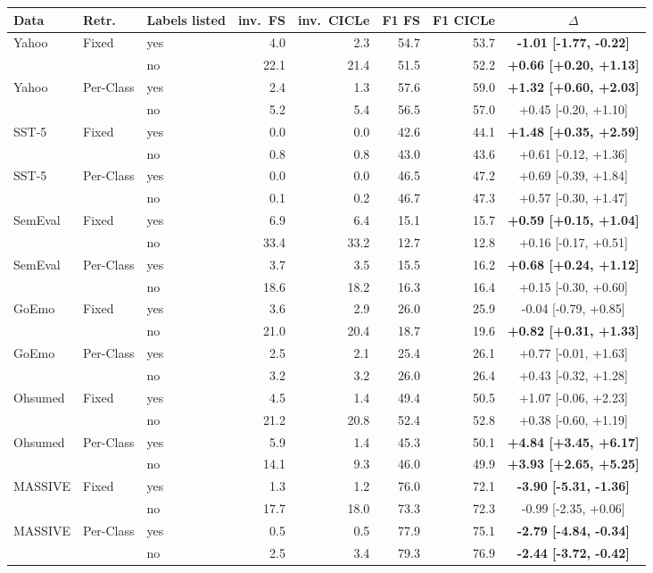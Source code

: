 \begin{tabular}{lllrrrrc}
\toprule
Data & Retr. & Labels listed & inv.\ FS & inv.\ CICLe & F1 FS & F1 CICLe & $\Delta$ \\
\midrule
Yahoo & Fixed & yes & 4.0 & 2.3 & 54.7 & 53.7 & \textbf{-1.01 [-1.77, -0.22]} \\
 &  & no & 22.1 & 21.4 & 51.5 & 52.2 & \textbf{+0.66 [+0.20, +1.13]} \\
Yahoo & Per-Class & yes & 2.4 & 1.3 & 57.6 & 59.0 & \textbf{+1.32 [+0.60, +2.03]} \\
 &  & no & 5.2 & 5.4 & 56.5 & 57.0 & +0.45 [-0.20, +1.10] \\
\addlinespace
SST-5 & Fixed & yes & 0.0 & 0.0 & 42.6 & 44.1 & \textbf{+1.48 [+0.35, +2.59]} \\
 &  & no & 0.8 & 0.8 & 43.0 & 43.6 & +0.61 [-0.12, +1.36] \\
SST-5 & Per-Class & yes & 0.0 & 0.0 & 46.5 & 47.2 & +0.69 [-0.39, +1.84] \\
 &  & no & 0.1 & 0.2 & 46.7 & 47.3 & +0.57 [-0.30, +1.47] \\
\addlinespace
SemEval & Fixed & yes & 6.9 & 6.4 & 15.1 & 15.7 & \textbf{+0.59 [+0.15, +1.04]} \\
 &  & no & 33.4 & 33.2 & 12.7 & 12.8 & +0.16 [-0.17, +0.51] \\
SemEval & Per-Class & yes & 3.7 & 3.5 & 15.5 & 16.2 & \textbf{+0.68 [+0.24, +1.12]} \\
 &  & no & 18.6 & 18.2 & 16.3 & 16.4 & +0.15 [-0.30, +0.60] \\
\addlinespace
GoEmo & Fixed & yes & 3.6 & 2.9 & 26.0 & 25.9 & -0.04 [-0.79, +0.85] \\
 &  & no & 21.0 & 20.4 & 18.7 & 19.6 & \textbf{+0.82 [+0.31, +1.33]} \\
GoEmo & Per-Class & yes & 2.5 & 2.1 & 25.4 & 26.1 & +0.77 [-0.01, +1.63] \\
 &  & no & 3.2 & 3.2 & 26.0 & 26.4 & +0.43 [-0.32, +1.28] \\
\addlinespace
Ohsumed & Fixed & yes & 4.5 & 1.4 & 49.4 & 50.5 & +1.07 [-0.06, +2.23] \\
 &  & no & 21.2 & 20.8 & 52.4 & 52.8 & +0.38 [-0.60, +1.19] \\
Ohsumed & Per-Class & yes & 5.9 & 1.4 & 45.3 & 50.1 & \textbf{+4.84 [+3.45, +6.17]} \\
 &  & no & 14.1 & 9.3 & 46.0 & 49.9 & \textbf{+3.93 [+2.65, +5.25]} \\
\addlinespace
MASSIVE & Fixed & yes & 1.3 & 1.2 & 76.0 & 72.1 & \textbf{-3.90 [-5.31, -1.36]} \\
 &  & no & 17.7 & 18.0 & 73.3 & 72.3 & -0.99 [-2.35, +0.06] \\
MASSIVE & Per-Class & yes & 0.5 & 0.5 & 77.9 & 75.1 & \textbf{-2.79 [-4.84, -0.34]} \\
 &  & no & 2.5 & 3.4 & 79.3 & 76.9 & \textbf{-2.44 [-3.72, -0.42]} \\
\bottomrule
\end{tabular}
